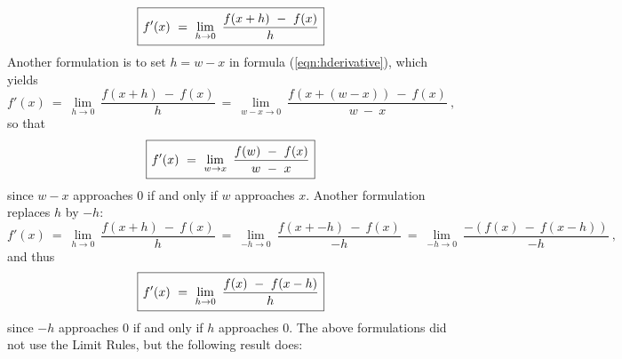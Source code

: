 \begin{equation}\label{eqn:hderivative}
 \setlength{\fboxsep}{4pt}\boxed{f'(x) ~=~ \lim_{h \to 0} ~\frac{f(x + h) ~-~ f(x)}{h}}
\end{equation}
\newpage
\noindent Another formulation is to set $h=w-x$ in formula
(\ref{eqn:hderivative}), which yields
\begin{displaymath}
 f'(x) ~=~ \lim_{h \to 0} ~\frac{f(x + h) ~-~ f(x)}{h}
  ~=~ \lim_{w-x \to 0} ~\frac{f(x + (w-x)) ~-~ f(x)}{w ~-~ x} ~,
\end{displaymath}
so that
\begin{equation}\label{eqn:wxderivative}
 \setlength{\fboxsep}{4pt}\boxed{f'(x) ~=~ \lim_{w \to x} ~\frac{f(w) ~-~ f(x)}{w ~-~ x}}
\end{equation}
since $w-x$ approaches 0 if and only if $w$ approaches $x$. Another formulation
replaces $h$ by $-h$:
\begin{displaymath}
 f'(x) ~=~ \lim_{h \to 0} ~\frac{f(x + h) ~-~ f(x)}{h}
  ~=~ \lim_{-h \to 0} ~\frac{f(x + -h) ~-~ f(x)}{-h} ~=~
  \lim_{-h \to 0} ~\frac{-\left(f(x) ~-~ f(x - h)\right)}{-h}~,
\end{displaymath}
and thus
\begin{equation}\label{eqn:neghderivative}
 \setlength{\fboxsep}{4pt}\boxed{f'(x) ~=~ \lim_{h \to 0} ~\frac{f(x) ~-~ f(x-h)}{h}}
\end{equation}
since $-h$ approaches 0 if and only if $h$ approaches $0$.
The above formulations did not use the Limit Rules, but the
following result does:


